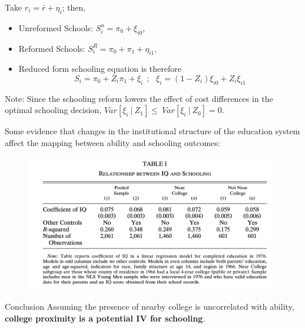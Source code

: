 \documentclass{beamer}
\begin{document}
\begin{frame}{}
    Take $r_{i}= \bar{r}+\eta_{i}$; then, 
    \begin{itemize}
        \item Unreformed Schools: $S_{i}^{u}= \pi_{0} + \xi_{i0}$,
        \item Reformed Schools: $S_{i}^{R}= \pi_{0} + \pi_{1} + \eta_{i1}$,
        \item Reduced form schooling equation is therefore
              \begin{equation*}
                  S_{i}= \pi_{0} + Z_{i}\pi_{1} + \xi_{i}~~; ~~~\xi_{i} = (1-Z_{i})\xi_{i0} + Z_{i}\xi_{i1}
              \end{equation*}
    \end{itemize}
    
    \begin{block}{Note:}
     Since the schooling reform lowers the effect of cost differences in the optimal schooling decision, $Var[\xi_{i}~|~Z_{1}] \leq~Var[\xi_{i}~|~Z_{0}]=0 $.
    
    \end{block}
\end{frame}


\begin{frame}{}
    Some evidence that changes in the institutional structure of the education system affect the mapping between ability and schooling outcomes:
    \begin{figure}
        \centering
        \includegraphics[scale= .5]{Table1.png}
    \end{figure}
    
    \begin{block}{Conclusion}
    Assuming the presence of nearby college is uncorrelated with ability, \textbf{college proximity is a potential IV for schooling}. 
     
    \end{block}
\end{frame}
\end{document}

